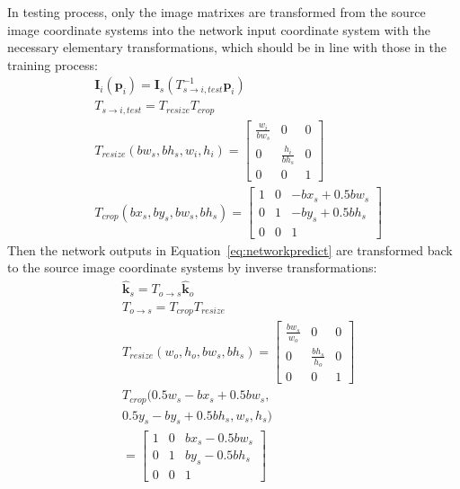 \documentclass[10pt,journal,compsoc]{IEEEtran}
\begin{document}
In testing process, only the image matrixes are transformed from the source image coordinate systems into the network input coordinate system with the necessary elementary transformations, which should be in line with those in the training process:
\begin{equation}
\label{eq:s2itest}
    \begin{split}
    &\textbf{I}_i(\textbf{p}_i) = \textbf{I}_s(T_{s\rightarrow i,test}^{-1}\textbf{p}_i)\\
    &T_{s\rightarrow i,test} = T_{resize}T_{crop}\\
    &T_{resize}(bw_s,bh_s,w_i,h_i)=\begin{bmatrix} \frac{w_i}{bw_s} & 0 & 0 \\
                    0 & \frac{h_i}{bh_s} & 0 \\
                    0 & 0 &1 \end{bmatrix}\\
    &T_{crop}(bx_s,by_s,bw_s,bh_s)=\begin{bmatrix} 1 & 0 & -bx_s+0.5bw_s \\
                    0 & 1 & -by_s+0.5bh_s \\
                    0 & 0 &1 \end{bmatrix}
    \end{split}
\end{equation}
Then the network outputs in Equation~\ref{eq:networkpredict} are transformed back to the source image coordinate systems by inverse transformations:
\begin{equation}
\label{eq:o2stest}
    \begin{split}
    &\hat{\textbf{k}}_s = T_{o\rightarrow s}\hat{\textbf{k}}_o\\
    &T_{o\rightarrow s} = T_{crop}T_{resize}\\
    &T_{resize}(w_o,h_o,bw_s,bh_s)=\begin{bmatrix} \frac{bw_s}{w_o} & 0 & 0 \\
                    0 & \frac{bh_s}{h_o} & 0 \\
                    0 & 0 &1 \end{bmatrix}\\
    &T_{crop}(0.5w_s-bx_s+0.5bw_s,\\
    &0.5y_s-by_s+0.5bh_s,w_s,h_s)\\
    &=\begin{bmatrix} 1 & 0 & bx_s-0.5bw_s \\
                    0 & 1 & by_s-0.5bh_s \\
                    0 & 0 &1 \end{bmatrix}
    \end{split}
\end{equation}
\end{document}
